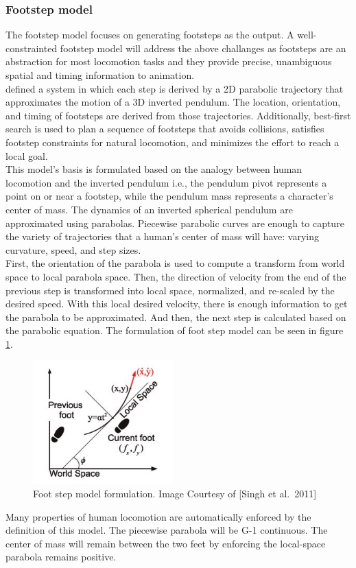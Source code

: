 \documentclass[tog]{acmsiggraph}
\begin{document}
\subsubsection{Footstep model}
The footstep model focuses on generating footsteps as the output. A well-constrainted footstep model will address the above challanges as footsteps are an abstraction for most locomotion tasks and they provide precise, unambiguous spatial and timing information to animation.
\\
\cite{singh2011footstep} defined a system in which each step is derived by a 2D parabolic trajectory that approximates the motion of a 3D inverted pendulum. The location, orientation, and timing of footsteps are derived from those trajectories. Additionally, best-first search is used to plan a sequence of footsteps that avoids collisions, satisfies footstep constraints for natural locomotion, and minimizes the effort to reach a local goal. 
\\
This model's basis is formulated based on the analogy between human locomotion and the inverted pendulum i.e., the pendulum pivot represents a point on or near a footstep, while the pendulum mass represents a character’s center of mass. The dynamics of an inverted spherical pendulum are approximated using parabolas. Piecewise parabolic curves are enough to capture the variety of trajectories that a human’s center of mass will have: varying curvature, speed, and step sizes.
\\
First, the orientation of the parabola is used to compute a transform from world space to local parabola space. Then, the direction of velocity from the end of the previous step is transformed into local space, normalized, and re-scaled by the desired speed. With this local desired velocity, there is enough information to get the parabola to be approximated. And then, the next step is calculated based on the parabolic equation. The formulation of foot step model can be seen in figure \ref{fig:FootSetp}.

\begin{figure}[h]
  \begin{center}
    \includegraphics[width=0.48\textwidth]{images/FootStep}
  \end{center}
  \caption{Foot  step model formulation. Image Courtesy of [Singh et al.\ 2011] }
  \label{fig:FootSetp}
\end{figure}
Many properties of human locomotion are automatically enforced by the definition of this model. The piecewise parabola will be G-1 continuous. The center of mass will remain between the two feet by enforcing the local-space parabola remains positive.
\end{document}
